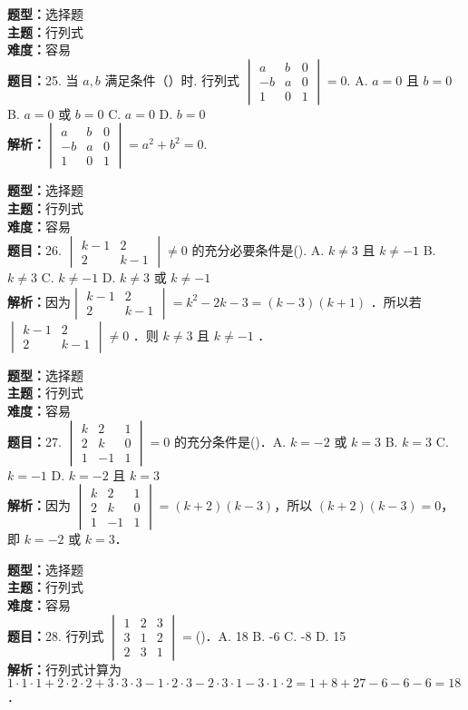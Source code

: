 \documentclass{ctexart}
\newenvironment{question}[5]{%
	\noindent\textbf{题型：}#1\\
	\textbf{主题：}#2\\
	\textbf{难度：}#3\\
	\textbf{题目：}#4\\
	\textbf{解析：}#5\\
	\vspace{1em}
}{}
\begin{document}
	\begin{question}
		{选择题}
		{行列式}
		{容易}
		{25. 当 \(a, b\) 满足条件（）时. 行列式 \(\begin{vmatrix} a & b & 0 \\ -b & a & 0 \\ 1 & 0 & 1\end{vmatrix}=0.\) A. \(a=0\) 且 \(b=0\) B. \(a=0\) 或 \(b=0\) C. \(a=0\) D. \(b=0\)}
		{\(\begin{vmatrix} a & b & 0 \\ -b & a & 0 \\ 1 & 0 & 1\end{vmatrix}=a^2+b^2=0\).}
	\end{question}
	
	\begin{question}
		{选择题}
		{行列式}
		{容易}
		{26. \(\begin{vmatrix} k-1 & 2 \\ 2 & k-1\end{vmatrix} \neq 0\) 的充分必要条件是(). A. \(k \neq 3\) 且 \(k \neq-1\) B. \(k \neq 3\) C. \(k \neq-1\) D. \(k \neq 3\) 或 \(k \neq-1\)}
		{因为\(\begin{vmatrix} k-1 & 2 \\ 2 & k-1\end{vmatrix}=k^2-2 k-3=(k-3)(k+1)\) ．所以若 \(\begin{vmatrix} k-1 & 2 \\ 2 & k-1\end{vmatrix} \neq 0\) ．则 \(k \neq 3\) 且 \(k \neq-1\) ．}
	\end{question}
	
	
	\begin{question}
		{选择题}
		{行列式}
		{容易}
		{27. \(\begin{vmatrix} k & 2 & 1 \\ 2 & k & 0 \\ 1 & -1 & 1\end{vmatrix}=0\) 的充分条件是(\qquad)．A. \(k=-2\) 或 \(k=3\) B. \(k=3\) C. \(k=-1\) D. \(k=-2\) 且 \(k=3\)}
		{因为 \(\begin{vmatrix} k & 2 & 1 \\ 2 & k & 0 \\ 1 & -1 & 1\end{vmatrix}=(k+2)(k-3)\)，所以 \((k+2)(k-3)=0\)，即 \(k=-2\) 或 \(k=3\)．}
	\end{question}
	
	\begin{question}
		{选择题}
		{行列式}
		{容易}
		{28. 行列式 \(\begin{vmatrix} 1 & 2 & 3 \\ 3 & 1 & 2 \\ 2 & 3 & 1\end{vmatrix}=\)(\qquad)．A. 18 B. -6 C. -8 D. 15}
		{行列式计算为 \(1 \cdot 1 \cdot 1 + 2 \cdot 2 \cdot 2 + 3 \cdot 3 \cdot 3 - 1 \cdot 2 \cdot 3 - 2 \cdot 3 \cdot 1 - 3 \cdot 1 \cdot 2 = 1 + 8 + 27 - 6 - 6 - 6 = 18\)．}
	\end{question}
	
\end{document}
